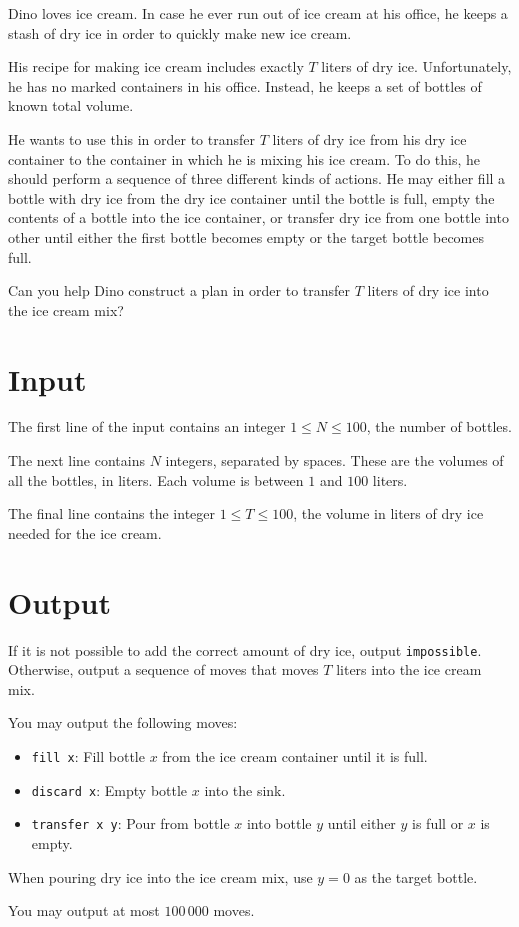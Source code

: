 Dino loves ice cream. 
In case he ever run out of ice cream at his office, he keeps a stash of dry ice in order to quickly make new ice cream.

His recipe for making ice cream includes exactly $T$ liters of dry ice.
Unfortunately, he has no marked containers in his office.
Instead, he keeps a set of bottles of known total volume.

He wants to use this in order to transfer $T$ liters of dry ice from his dry ice container to the container in which he is mixing his ice cream.
To do this, he should perform a sequence of three different kinds of actions.
He may either fill a bottle with dry ice from the dry ice container until the bottle is full, empty the contents of a bottle into the ice container, or transfer dry ice from one bottle into other until either the first bottle becomes empty or the target bottle becomes full.

Can you help Dino construct a plan in order to transfer $T$ liters of dry ice into the ice cream mix?

\section*{Input}
The first line of the input contains an integer $1 \le N \le 100$, the number of bottles.

The next line contains $N$ integers, separated by spaces.
These are the volumes of all the bottles, in liters.
Each volume is between $1$ and $100$ liters.

The final line contains the integer $1 \le T \le 100$, the volume in liters of dry ice needed for the ice cream.

\section*{Output}
If it is not possible to add the correct amount of dry ice, output \texttt{impossible}.
Otherwise, output a sequence of moves that moves $T$ liters into the ice cream mix.

You may output the following moves:
\begin{itemize}
\item \texttt{fill x}: Fill bottle $x$ from the ice cream container until it is full.
\item \texttt{discard x}: Empty bottle $x$ into the sink.
\item \texttt{transfer x y}: Pour from bottle $x$ into bottle $y$ until either $y$ is full or $x$ is empty.
\end{itemize}

When pouring dry ice into the ice cream mix, use $y = 0$ as the target bottle.

You may output at most $100\,000$ moves.

